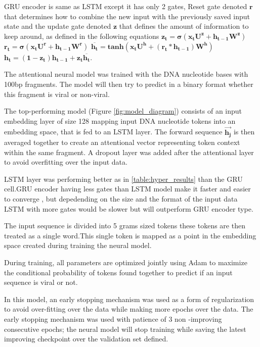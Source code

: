 \documentclass[conference]{IEEEtran}
\begin{document}
GRU encoder is same as LSTM except it has only 2 gates, Reset gate denoted $\mathbf{r}$ that determines how to combine the new input with the previously saved input state and the update gate denoted $\mathbf{z}$ that defines the amount of information to keep around, as defined  in the following equations \newline
$\mathbf{z_{t}=\sigma(x_{t}U^z + h_{t-1}W^z)}$ \newline
$\mathbf{r_{t}=\sigma(x_{t}U^r + h_{t-1}W^r)}$ \newline
$\mathbf{\overline{h_{t}} = tanh(x_{t}U^h + (r_{t} * h_{t-1})W^h )}$ \newline
$\mathbf{ h_{t} = (1-z_{t})h_{t-1} +z_{t}\overline{h_{t}}}$.


The attentional neural model was trained with the DNA nucleotide bases with 100bp fragments. The model will then try to predict in a binary format whether this fragment is viral or non-viral.

The top-performing model (Figure \ref{fig:model_diagram}) consists of an input embedding layer of size 128 mapping input DNA nucleotide tokens into an embedding space, that is fed to an LSTM layer. The forward sequence $\mathbf{\overrightarrow{h_{j}}}$ is then averaged together to create an attentional vector representing token context within the same fragment. A dropout layer was added after the attentional layer to avoid overfitting over the input data.

LSTM layer was performing better as in \ref{table:hyper_results} than the GRU cell.GRU encoder having less gates than LSTM model make it faster and easier to converge , but depedending on the size and the format of the input data LSTM with more gates would be slower but will outperform GRU encoder type.

The input sequence is divided into 5 grams sized tokens these tokens are then treated as a single word.This single token is mapped as a point in the embedding space created during training the neural model.

During training, all parameters are optimized jointly using Adam to maximize the conditional probability of tokens found together to predict if an input sequence is viral or not.

In this model, an early stopping mechanism was used as a form of regularization to avoid over-fitting over the data while making more epochs over the data. The early stopping mechanism was used with patience of 3 non -improving consecutive epochs; the neural model will stop training while saving the latest improving checkpoint over the validation set defined.
\end{document}
